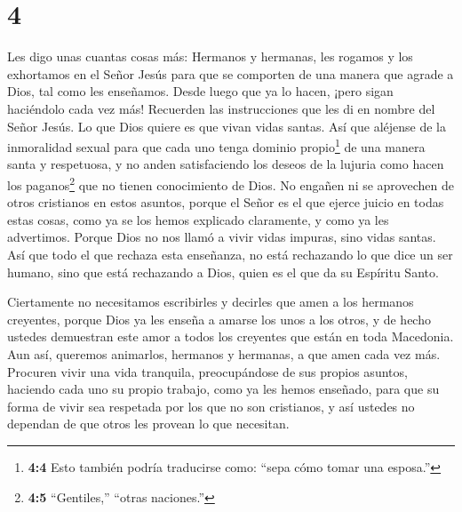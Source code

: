 \hypertarget{section-3}{%
\section{4}\label{section-3}}

 Les digo unas cuantas cosas más: Hermanos y hermanas, les
rogamos y los exhortamos en el Señor Jesús para que se comporten de una
manera que agrade a Dios, tal como les enseñamos. Desde luego que ya lo
hacen, ¡pero sigan haciéndolo cada vez más!  Recuerden las
instrucciones que les di en nombre del Señor Jesús.  Lo que
Dios quiere es que vivan vidas santas. Así que aléjense de la
inmoralidad sexual  para que cada uno tenga dominio
propio\footnote{\textbf{4:4} Esto también podría traducirse como: ``sepa
  cómo tomar una esposa.''} de una manera santa y respetuosa,
 y no anden satisfaciendo los deseos de la lujuria como
hacen los paganos\footnote{\textbf{4:5} ``Gentiles,'' ``otras
  naciones.''} que no tienen conocimiento de Dios.  No
engañen ni se aprovechen de otros cristianos en estos asuntos, porque el
Señor es el que ejerce juicio en todas estas cosas, como ya se los hemos
explicado claramente, y como ya les advertimos.  Porque Dios
no nos llamó a vivir vidas impuras, sino vidas santas.  Así
que todo el que rechaza esta enseñanza, no está rechazando lo que dice
un ser humano, sino que está rechazando a Dios, quien es el que da su
Espíritu Santo.

 Ciertamente no necesitamos escribirles y decirles que amen
a los hermanos creyentes, porque Dios ya les enseña a amarse los unos a
los otros,  y de hecho ustedes demuestran este amor a todos
los creyentes que están en toda Macedonia. Aun así, queremos animarlos,
hermanos y hermanas, a que amen cada vez más.  Procuren
vivir una vida tranquila, preocupándose de sus propios asuntos, haciendo
cada uno su propio trabajo, como ya les hemos enseñado, 
para que su forma de vivir sea respetada por los que no son cristianos,
y así ustedes no dependan de que otros les provean lo que necesitan.

